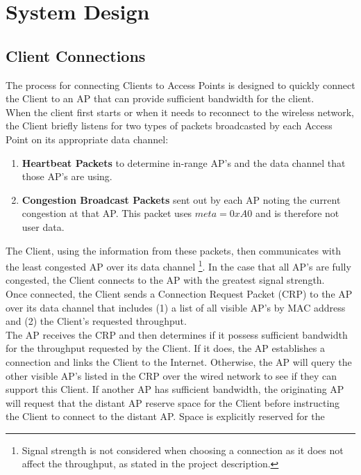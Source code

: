 \documentclass[11pt,twocolumn]{article}
\begin{document}
\section{System Design}

\subsection{Client Connections}

\indent
The process for connecting Clients to Access Points is designed to quickly connect the Client to an AP that can provide sufficient bandwidth for 
the client.\\
\indent
When the client first starts or when it needs to reconnect to the wireless network, the Client briefly listens for two types of packets broadcasted 
by each Access Point on its appropriate data channel:
\begin{enumerate}
	\item \textbf{Heartbeat Packets} to determine in-range AP's and the data channel that those AP's are using.
	\item \textbf{Congestion Broadcast Packets} sent out by each AP noting the current congestion at that AP. This packet uses $meta=0xA0$ and is therefore
	not user data.
\end{enumerate}
\indent
The Client, using the information from these packets, then communicates with the least congested AP over its data channel 
\footnote{Signal strength is not considered when choosing a connection as it does not affect the throughput, as stated in the project 
description.}. In the case that all AP's are fully congested, the Client connects to the AP with the greatest signal strength.\\
\indent
Once connected, the Client sends a Connection Request Packet (CRP) to the AP over its data channel that includes (1) a list of all visible AP's by 
MAC address and (2) the Client's requested throughput. \\
\indent
The AP receives the CRP and then determines if it possess sufficient bandwidth for the throughput requested by the Client. If it does, the AP 
establishes a connection and links the Client to the Internet. Otherwise, the AP will query the other visible AP's listed in the CRP over 
the wired network to see if they can support this Client. If another AP has sufficient bandwidth, the originating AP will request 
that the distant AP reserve space for the Client before instructing the Client to connect to the distant AP. Space is explicitly reserved for the 
\end{document}
